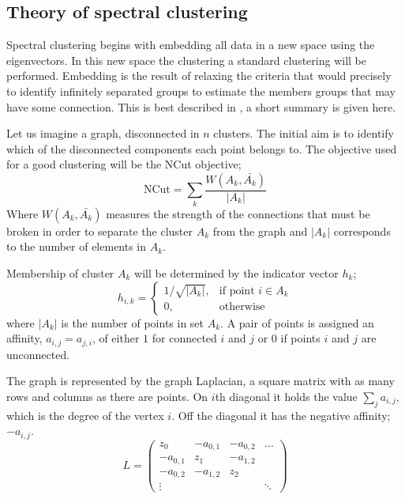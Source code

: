 \subsection{Theory of spectral clustering}\label{sec:spectral_theory}

Spectral clustering begins with embedding all data in a new space using the eigenvectors.
In this new space the clustering a standard clustering will be performed.
Embedding is the result of relaxing the criteria that would precisely
to identify infinitely separated groups to estimate the members  groups that may have some connection.
This is best described in \cite{luxburg2007spectraltutorial}, a short summary is given here.

Let us imagine a graph, disconnected in \(n\) clusters.
The initial aim is to identify which of the disconnected components each point belongs to.
The objective used for a good clustering will be the NCut objective;
\begin{equation}
    \text{NCut} = \sum_k\frac{W(A_k, \bar{A_k})}{|A_k|}
\end{equation}
Where \(W(A_k, \bar{A_k})\) measures the strength of the connections that must be
broken in order to separate the cluster \(A_k\) from the graph
and \(|A_k|\) corresponds to the number of elements in \(A_k\).

Membership of cluster \(A_k\) will be determined by the indicator vector \(h_k\);
\begin{equation}
    h_{i, k}= 
    \begin{cases}
        1/\sqrt{|A_k|},& \text{if point } i \in A_k \\
        0,              & \text{otherwise}
    \end{cases}
\end{equation}
where \(|A_k|\) is the number of points in set \(A_k\).
A pair of points is assigned an affinity, \(a_{i,j} = a_{j, i}\),
of either \(1\) for connected \(i\) and \(j\) or \(0\) 
if points \(i\) and \(j\) are unconnected.

The graph is represented by the graph Laplacian, a square
matrix with as many rows and columns as there are points.
On \(i\)th diagonal it holds the value \(\sum_j a_{i, j}\),
which is the degree of the vertex \(i\).
Off the diagonal it has the negative affinity; \(-a_{i, j}\).
\begin{equation}\label{eqn:laplacian}
    L = 
    \begin{pmatrix}
        z_0 & -a_{0,1} & -a_{0,2} & \hdots \\
        -a_{0,1} & z_1 & -a_{1,2} & \\
        -a_{0,2} & -a_{1,2} & z_2 & \\
        \vdots   &          &     & \ddots 
    \end{pmatrix}
\end{equation}

